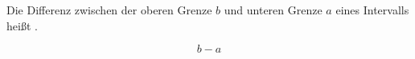 Die Differenz zwischen der oberen Grenze $b$ und unteren Grenze $a$ eines Intervalls heißt .

$$b-a$$